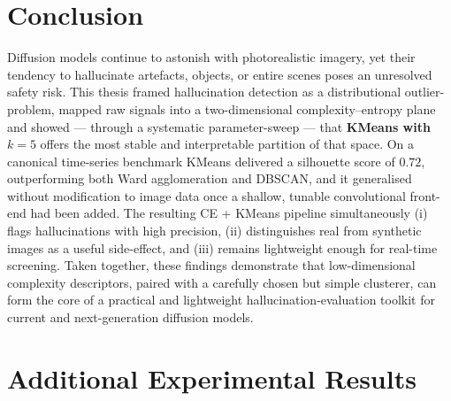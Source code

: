 \documentclass{article}
\begin{document}
\section{Conclusion}\label{sec:conclusions}

Diffusion models continue to astonish with photorealistic imagery, yet
their tendency to hallucinate artefacts, objects, or entire scenes
poses an unresolved safety risk.  
This thesis framed hallucination detection as a distributional
outlier-problem, mapped raw signals into a two-dimensional
complexity–entropy plane and showed — through a systematic
parameter-sweep — that \textbf{KMeans with \(k=5\)} offers the most stable
and interpretable partition of that space.  
On a canonical time-series benchmark KMeans delivered a silhouette score
of \(0.72\), outperforming both Ward agglomeration and DBSCAN, and it
generalised without modification to image data once a shallow,
tunable convolutional front-end had been added.  
The resulting CE + KMeans pipeline simultaneously (i) flags
hallucinations with high precision, (ii) distinguishes real from
synthetic images as a useful side-effect, and (iii) remains lightweight
enough for real-time screening.  
Taken together, these findings demonstrate that low-dimensional
complexity descriptors, paired with a carefully chosen but simple
clusterer, can form the core of a practical and lightweight hallucination-evaluation
toolkit for current and next-generation diffusion models.

\clearpage



\clearpage
\appendix
\section{Additional Experimental Results}
\label{app:experiments}
\end{document}
